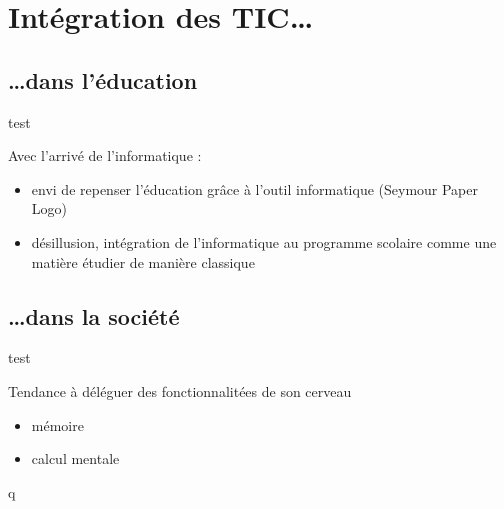 \section{Intégration des TIC\ldots}

\subsection{\ldots dans l'éducation}

\begin{frame}{test}

Avec l'arrivé de l'informatique :
\begin{itemize}
\item envi de repenser l'éducation grâce à l'outil informatique (Seymour Paper Logo)
\item désillusion, intégration de l'informatique au programme scolaire comme une matière étudier de manière classique
\end{itemize}

\end{frame}



\subsection{\ldots dans la société}

\begin{frame}{test}

Tendance à déléguer des fonctionnalitées de son cerveau 
\begin{itemize}
\item mémoire
\item calcul mentale
\end{itemize}

\end{frame}
q
